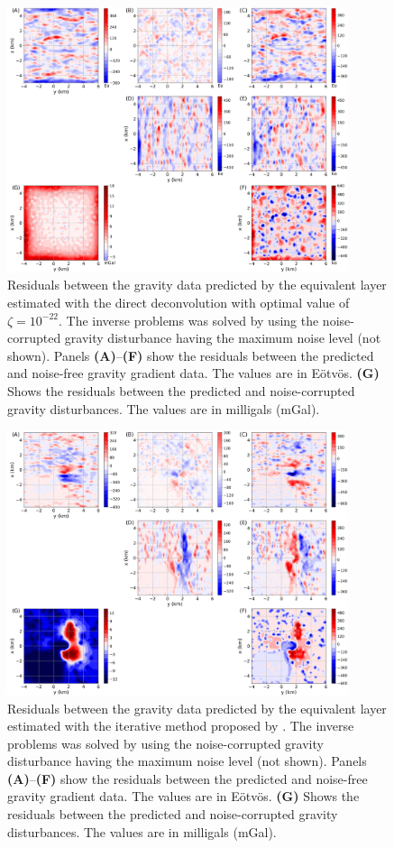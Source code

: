 \documentclass[utf8]{frontiers_suppmat} %
\begin{document}
\begin{figure}[htbp]
	\begin{center}
		\includegraphics[width=10cm]{Fig/deconv_residuals}
	\end{center}
	\caption{
		Residuals between the gravity data predicted by the equivalent layer estimated with 
		the direct deconvolution with  optimal value of $\zeta = 10^{-22}$.
		The inverse problems was solved by using the noise-corrupted gravity 
		disturbance having the maximum noise level (not shown).
		Panels \textbf{(A)}--\textbf{(F)} show the residuals between the predicted and 
		noise-free gravity gradient data. The values are in Eötvös.
		\textbf{(G)} Shows the residuals between the predicted and noise-corrupted gravity 
		disturbances. The values are in milligals (mGal).
	}
	\label{fig:residuals-deconv}
\end{figure}
	
\begin{figure}[htbp]
	\begin{center}
		\includegraphics[width=10cm]{Fig/C92_residuals}
	\end{center}
	\caption{
		Residuals between the gravity data predicted by the equivalent layer estimated with 
		the iterative method  proposed by \cite{cordell1992}.
		The inverse problems was solved by using the noise-corrupted gravity 
		disturbance having the maximum noise level (not shown).
		Panels \textbf{(A)}--\textbf{(F)} show the residuals between the predicted and 
		noise-free gravity gradient data. The values are in Eötvös.
		\textbf{(G)} Shows the residuals between the predicted and noise-corrupted gravity 
		disturbances. The values are in milligals (mGal).
	}
	\label{fig:residuals-C92}
\end{figure}
\end{document}
